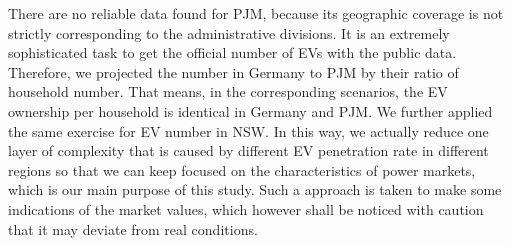 There are no reliable data found for PJM, because its geographic coverage is not strictly corresponding to the administrative divisions. It is an extremely sophisticated task to get the official number of EVs with the public data. Therefore, we projected the number in Germany to PJM by their ratio of household number. That means, in the corresponding scenarios, the EV ownership per household is identical in Germany and PJM. We further applied the same exercise for EV number in NSW. In this way, we actually reduce one layer of complexity that is caused by different EV penetration rate in different regions so that we can keep focused on the characteristics of power markets, which is our main purpose of this study. Such a approach is taken to make some indications of the market values, which however shall be noticed with caution that it may deviate from real conditions. 










